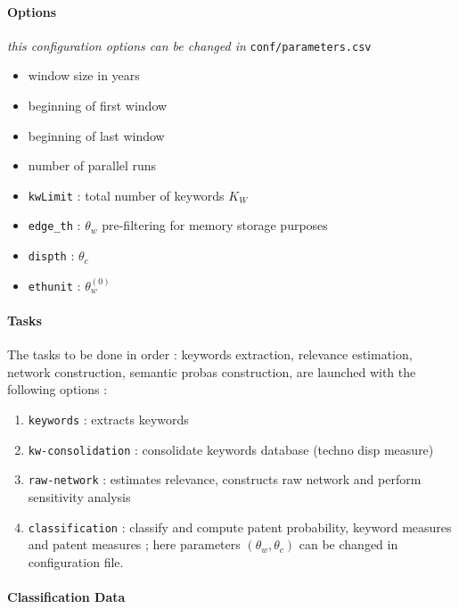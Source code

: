 \documentclass[12pt,twoside,a4paper]{article}
\begin{document}
\paragraph*{Options}

\textit{this configuration options can be changed in }\texttt{conf/parameters.csv}

\begin{itemize}
\item window size in years
\item beginning of first window
\item beginning of last window
\item number of parallel runs
\item \texttt{kwLimit} : total number of keywords $K_W$
\item \texttt{edge{\_}th} : $\theta_w$ pre-filtering for memory storage purposes
\item \texttt{dispth} : $\theta_c$
\item \texttt{ethunit} : $\theta_w^{(0)}$
\end{itemize}

\paragraph*{Tasks}

The tasks to be done in order : keywords extraction, relevance estimation, network construction, semantic probas construction, are launched with the following options :

\begin{enumerate}
\item \texttt{keywords} : extracts keywords
\item \texttt{kw-consolidation} : consolidate keywords database (techno disp measure)
\item \texttt{raw-network} : estimates relevance, constructs raw network and perform sensitivity analysis
\item \texttt{classification} : classify and compute patent probability, keyword measures and patent measures ; here parameters $(\theta_w,\theta_c)$ can be changed in configuration file.
\end{enumerate}



\paragraph*{Classification Data}
\end{document}
